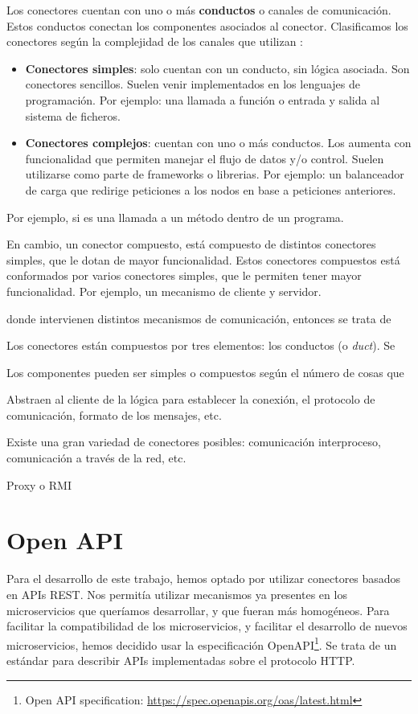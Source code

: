Los conectores cuentan con uno o más \textbf{conductos} o canales de comunicación. Estos conductos conectan los componentes asociados al conector. Clasificamos los conectores según la complejidad de los canales que utilizan \cite{mehtaTaxonomySoftwareConnectors2000}:

\begin{itemize}
    \item \textbf{Conectores simples}: solo cuentan con un conducto, sin lógica asociada. Son conectores sencillos. Suelen venir implementados en los lenguajes de programación. Por ejemplo: una llamada a función o entrada y salida al sistema de ficheros.

    \item \textbf{Conectores complejos}: cuentan con uno o más conductos. Los aumenta con funcionalidad que permiten manejar el flujo de datos y/o control. Suelen utilizarse como parte de frameworks o librerias. Por ejemplo: un balanceador de carga que redirige peticiones a los nodos en base a peticiones anteriores.
\end{itemize}

 Por ejemplo, si es una llamada a un método dentro de un programa.

En cambio, un conector compuesto, está compuesto de distintos conectores simples, que le dotan de mayor funcionalidad. Estos conectores compuestos está conformados por varios conectores simples, que le permiten tener mayor funcionalidad. Por ejemplo, un mecanismo de cliente y servidor.

donde intervienen distintos mecanismos de comunicación, entonces se trata de

Los conectores están compuestos por tres elementos: los conductos (o \textit{duct}). Se

Los componentes pueden ser simples o compuestos según el número de cosas que

Abstraen al cliente de la lógica para establecer la conexión, el protocolo de comunicación, formato de los mensajes, etc.

Existe una gran variedad de conectores posibles: comunicación interproceso, comunicación a través de la red, etc.

Proxy o RMI

\section{Open API}

Para el desarrollo de este trabajo, hemos optado por utilizar conectores basados en APIs REST. Nos permitía utilizar mecanismos ya presentes en los microservicios que queríamos desarrollar, y que fueran más homogéneos.
Para facilitar la compatibilidad de los microservicios, y facilitar el desarrollo de nuevos microservicios, hemos decidido usar la especificación OpenAPI\footnote{Open API specification: \url{https://spec.openapis.org/oas/latest.html}}. Se trata de un estándar para describir APIs implementadas sobre el protocolo HTTP.

